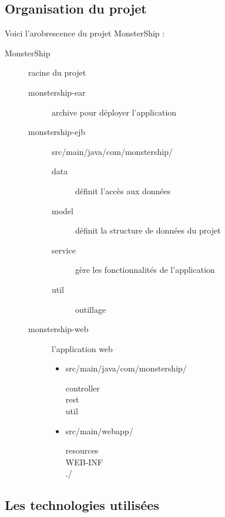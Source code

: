 \documentclass[a4paper,11pt]{report}
\begin{document}
    \subsection{Organisation du projet}
      Voici l'arobrescence du projet MonsterShip :
      \begin{description}
        \item[MonsterShip] racine du projet
        \begin{description}
          \item[monstership-ear] archive pour déployer l'application
          \item[monstership-ejb] src/main/java/com/monstership/
          \begin{description}
            \item[data] définit l'accès aux données
            \item[model] définit la structure de données du projet
            \item[service] gère les fonctionnalités de l'application 
            \item[util] outillage
          \end{description}
          \item[monstership-web] l'application web
          \begin{itemize}
            \item src/main/java/com/monstership/
            \begin{description}
              \item[controller]
              \item[rest]
              \item[util] 
            \end{description}
            \item src/main/webapp/
            \begin{description}
              \item[resources] 
              \item[WEB-INF]
              \item[./] 
            \end{description}
          \end{itemize}
          
          
        \end{description}
      \end{description}
    \subsection{Les technologies utilisées}
\end{document}
